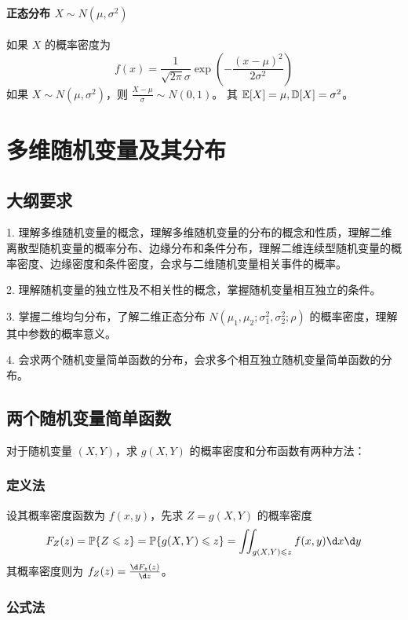 \paragraph{正态分布 $X \sim N(\mu, \sigma^2)$}
如果 $X$ 的概率密度为
\[ f(x) = \frac{1}{\sqrt{2 \pi}  \sigma} \exp \left(- \frac{(x - \mu)^2}{2\sigma^2}  \right) \]
如果 $X \sim N(\mu, \sigma^2)$，则 $\frac{X - \mu}{\sigma} \sim N(0, 1)$。
其 $\mathbb{E} [X] = \mu, \mathbb{D} [X] = \sigma^2$。


\section{多维随机变量及其分布}

\subsection{大纲要求}

1. 理解多维随机变量的概念，理解多维随机变量的分布的概念和性质，理解二维离散型随机变量的概率分布、边缘分布和条件分布，理解二维连续型随机变量的概率密度、边缘密度和条件密度，会求与二维随机变量相关事件的概率。

2. 理解随机变量的独立性及不相关性的概念，掌握随机变量相互独立的条件。

3. 掌握二维均匀分布，了解二维正态分布 $N(\mu_1, \mu_2; \sigma_1^2, \sigma_2^2; \rho)$ 的概率密度，理解其中参数的概率意义。

4. 会求两个随机变量简单函数的分布，会求多个相互独立随机变量简单函数的分布。

\subsection{两个随机变量简单函数}

对于随机变量 $(X, Y)$，求 $g(X, Y)$ 的概率密度和分布函数有两种方法：

\subsubsection*{定义法}

设其概率密度函数为 $f(x, y)$，先求 $Z = g(X, Y)$ 的概率密度
\[ F_Z(z) = \bbP\{Z \leqslant z\} = \bbP\{g(X,Y) \leqslant z\} = \iint_{g(X,Y) \leqslant z} f(x, y) \d x \d y \]
其概率密度则为 $f_Z(z) = \frac{\d F_z(z)}{\d z}$。

\subsubsection*{公式法}

